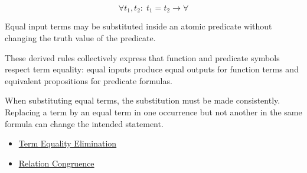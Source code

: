 \begin{remark*}
\[
  \forall t_1, t_2:\; t_1=t_2 \to \forall
\]
\end{remark*}



\begin{remark*}[Interpretation]
Equal input terms may be substituted inside an atomic predicate without
changing the truth value of the predicate.
\end{remark*}



\begin{remark*}[Exposition]
These derived rules collectively express that function and predicate symbols
respect term equality: equal inputs produce equal outputs for function terms
and equivalent propositions for predicate formulas.
\end{remark*}

\begin{remark*}[Exposition]
When substituting equal terms, the substitution must be made consistently.
Replacing a term by an equal term in one occurrence but not another in the same
formula can change the intended statement.
\end{remark*}


\begin{dependencies}
\begin{itemize}
  \item \hyperref[def:eq-elim]{Term Equality Elimination}
  \item \hyperref[thm:axiomatic-equality-relation-congruence]{Relation Congruence}
\end{itemize}
\end{dependencies}
